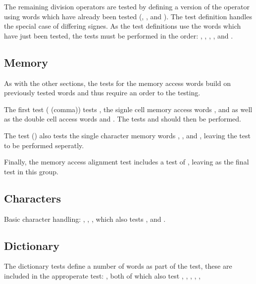 The remaining division operators are tested by defining a version of
the operator using words which have already been tested (,
,  and ).  The test definition
handles the special case of differing signes.  As the test definitions
use the words which have just been tested, the tests must be performed
in the order:
	,
	,
	,
	, and
	.

\subsection{Memory}

As with the other sections, the tests for the memory access words
build on previously tested words and thus require an order to the
testing.

The first test ( (comma)) tests , the
signle cell memory access words , \word{!} and 
as well as the double cell access words  and .  The
tests  and  should then be
performed.

The test () also tests the single character memory
words , , and , leaving the test
 to be performed seperatly.

Finally, the memory access alignment test 
includes a test of , leaving \linebreak {}
as the final test in this group.

\subsection{Characters}

Basic character handling:
	,
	,
	,
	\tref{core:[}{[} which also tests \word{]}, and
	.

\subsection{Dictionary}

The dictionary tests define a number of words as part of the test,
these are included in the approperate test:
	,
	 both of which also test ,
	,
	,
	,
	,

